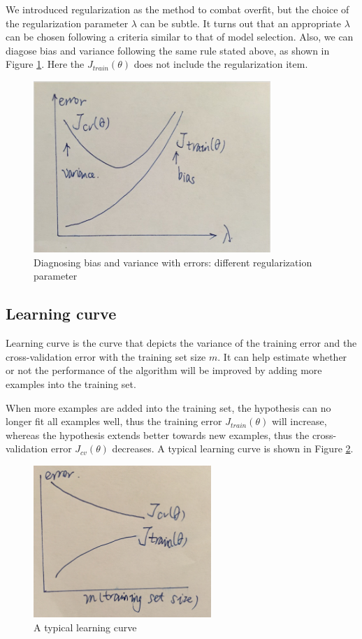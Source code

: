 We introduced regularization as the method to combat overfit, but the choice of the regularization parameter $\lambda$ can be subtle. It turns out that an appropriate $\lambda$ can be chosen following a criteria similar to that of model selection. Also, we can diagose bias and variance following the same rule stated above, as shown in Figure \ref{lambdachoice}. Here the $J_{train}(\theta)$ does not include the regularization item.
\begin{figure}[H]
\centering
\includegraphics[width = 0.8\textwidth]{lambdachoice.jpg}
\caption{Diagnosing bias and variance with errors: different regularization parameter}\label{lambdachoice}
\end{figure}
\subsection{Learning curve}
Learning curve is the curve that depicts the variance of the training error and the cross-validation error with the training set size $m$. It can help estimate whether or not the performance of the algorithm will be improved by adding more examples into the training set.

When more examples are added into the training set, the hypothesis can no longer fit all examples well, thus the training error $J_{train}(\theta)$ will increase, whereas the hypothesis extends better towards new examples, thus the cross-validation error $J_{cv}(\theta)$ decreases. A typical learning curve is shown in Figure \ref{learningcurve}. 
\begin{figure}[H]
\centering
\includegraphics[width = 0.6\textwidth]{learningcurve.jpg}
\caption{A typical learning curve}\label{learningcurve}
\end{figure}

